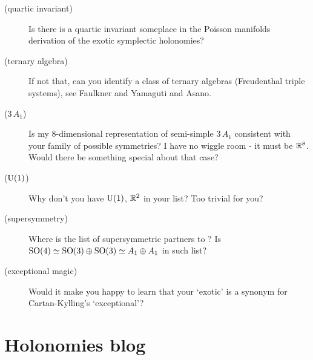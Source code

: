 \begin{description}
  \item[(quartic invariant)]
Is there is a quartic invariant someplace in the Poisson manifolds derivation
of the exotic symplectic holonomies?
  \item[(ternary algebra)]
If not that, can you identify a class of ternary algebras (Freudenthal triple
systems), see Faulkner and Yamaguti and
Asano.
  \item[($3\,A_1$)]
Is my 8-dimensional representation of semi-simple $3\,A_1$ consistent with your
family of possible symmetries? I have no wiggle room - it must be $\mathbb{R}^{8}$.
Would there be something special about that case?
  \item[(${\rm U}(1)$)]
Why don't you have ${\rm U}(1)  $, $\mathbb{R}^{2}$ in your list?
Too trivial for you?
  \item[(supersymmetry)]
Where is the list of supersymmetric partners to
?
Is
\(\textrm{SO}(4) \simeq \textrm{SO}(3)\oplus\textrm{SO}(3) \simeq A_1\oplus A_1
\)
in such list?
  \item[(exceptional magic)] Would it make you happy to learn that
your `exotic' is a synonym for Cartan-Kylling's `exceptional'?

\end{description}

\section{Holonomies blog}
\label{s-HolonomBlog}

